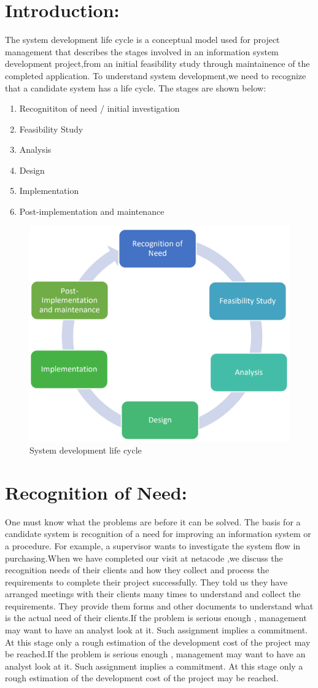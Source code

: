\documentclass[a4paper,12pt]{report}
\begin{document}
\section{Introduction:}
The system development life cycle is a conceptual model used for project management that describes the stages involved in an information system development project,from an initial feasibility study through maintainence of the completed application. To understand system development,we need to recognize that a candidate system has a life cycle. The stages are shown below:
\begin{enumerate}
	\item Recognititon of need / initial investigation
	\item	Feasibility Study
	\item	Analysis
	\item Design
	\item	Implementation
	\item	Post-implementation and maintenance   
	\end{enumerate}
\begin{figure}[h]
	\centering
	\includegraphics[width=0.7\linewidth]{2_1}
	\caption{System development life cycle}
	\label{fig:2_1}
\end{figure}
\section{Recognition of Need: }
One must know what the problems are before it can be solved. The basis for a candidate system is recognition of a need for improving an information system or a procedure. For example, a supervisor wants to investigate the system flow in purchasing.When we have completed our visit at netacode ,we discuss the recognition needs of their clients and how they collect and process the requirements to complete their project  successfully. They told us they have arranged meetings with their clients many times to understand and collect the requirements. They provide them forms and other documents to understand what is the actual need of their clients.If the problem is serious enough , management may want to have an analyst look at it. Such assignment  implies a commitment. At this stage only a rough estimation of the development cost of the project may be reached.If the problem is serious enough , management may want to have an analyst look at it. Such assignment  implies a commitment. At this stage only a rough estimation of the development cost of the project may be reached.
\end{document}
